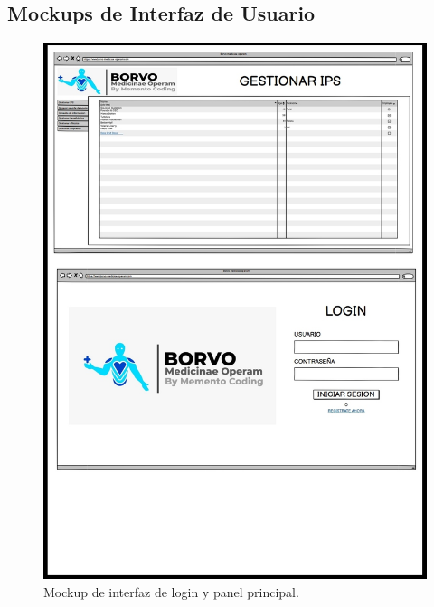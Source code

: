\documentclass[12pt,a4paper]{article}
\begin{document}
\subsection{Mockups de Interfaz de Usuario}
\begin{figure}[H]
\centering
{\includegraphics[width=1 \textwidth]{Mockup.jpg} \par}
\caption{Mockup de interfaz de login y panel principal.}
\end{figure}
\end{document}
